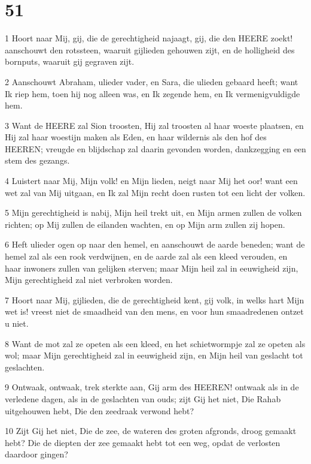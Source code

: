 \chapter{51}

\par 1 Hoort naar Mij, gij, die de gerechtigheid najaagt, gij, die den HEERE zoekt! aanschouwt den rotssteen, waaruit gijlieden gehouwen zijt, en de holligheid des bornputs, waaruit gij gegraven zijt.
\par 2 Aanschouwt Abraham, ulieder vader, en Sara, die ulieden gebaard heeft; want Ik riep hem, toen hij nog alleen was, en Ik zegende hem, en Ik vermenigvuldigde hem.
\par 3 Want de HEERE zal Sion troosten, Hij zal troosten al haar woeste plaatsen, en Hij zal haar woestijn maken als Eden, en haar wildernis als den hof des HEEREN; vreugde en blijdschap zal daarin gevonden worden, dankzegging en een stem des gezangs.
\par 4 Luistert naar Mij, Mijn volk! en Mijn lieden, neigt naar Mij het oor! want een wet zal van Mij uitgaan, en Ik zal Mijn recht doen rusten tot een licht der volken.
\par 5 Mijn gerechtigheid is nabij, Mijn heil trekt uit, en Mijn armen zullen de volken richten; op Mij zullen de eilanden wachten, en op Mijn arm zullen zij hopen.
\par 6 Heft ulieder ogen op naar den hemel, en aanschouwt de aarde beneden; want de hemel zal als een rook verdwijnen, en de aarde zal als een kleed verouden, en haar inwoners zullen van gelijken sterven; maar Mijn heil zal in eeuwigheid zijn, Mijn gerechtigheid zal niet verbroken worden.
\par 7 Hoort naar Mij, gijlieden, die de gerechtigheid kent, gij volk, in welks hart Mijn wet is! vreest niet de smaadheid van den mens, en voor hun smaadredenen ontzet u niet.
\par 8 Want de mot zal ze opeten als een kleed, en het schietwormpje zal ze opeten als wol; maar Mijn gerechtigheid zal in eeuwigheid zijn, en Mijn heil van geslacht tot geslachten.
\par 9 Ontwaak, ontwaak, trek sterkte aan, Gij arm des HEEREN! ontwaak als in de verledene dagen, als in de geslachten van ouds; zijt Gij het niet, Die Rahab uitgehouwen hebt, Die den zeedraak verwond hebt?
\par 10 Zijt Gij het niet, Die de zee, de wateren des groten afgronds, droog gemaakt hebt? Die de diepten der zee gemaakt hebt tot een weg, opdat de verlosten daardoor gingen?
